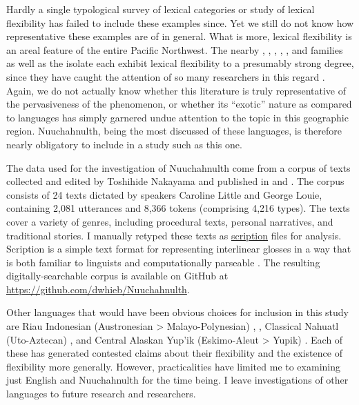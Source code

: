 Hardly a single typological survey of lexical categories or study of lexical flexibility has failed to include these examples since. Yet we still do not know how representative these examples are of  in general. What is more, lexical flexibility is an areal feature of the entire Pacific Northwest. The nearby , , , , , and  families as well as the isolate  each exhibit lexical flexibility to a presumably strong degree, since they have caught the attention of so many researchers in this regard . Again, we do not actually know whether this literature is truly representative of the pervasiveness of the phenomenon, or whether its \enquote{exotic} nature as compared to  languages has simply garnered undue attention to the topic in this geographic region. Nuuchahnulth, being the most discussed of these languages, is therefore nearly obligatory to include in a study such as this one.

The data used for the investigation of Nuuchahnulth come from a corpus of texts collected and edited by Toshihide Nakayama and published in \textcite{Little2003} and \textcite{Louie2003}. The corpus consists of 24 texts dictated by speakers Caroline Little and George Louie, containing 2,081 utterances and 8,366 tokens (comprising 4,216 types). The texts cover a variety of genres, including procedural texts, personal narratives, and traditional stories. I manually retyped these texts as \href{https://scription.digitallinguistics.io}{scription} files for analysis. Scription is a simple text format for representing interlinear glosses in a way that is both familiar to linguists and computationally parseable \parencite{Hieber2020b}. The resulting digitally-searchable corpus is available on GitHub at \url{https://github.com/dwhieb/Nuuchahnulth}.

Other languages that would have been obvious choices for inclusion in this study are Riau Indonesian (Austronesian > Malayo-Polynesian) \parencite{Gil1994},  \parencites{EvansOsada2005}{HengeveldRijkhoff2005}, Classical Nahuatl (Uto-Aztecan) \parencites{Launey1994}{Launey2004}, and Central Alaskan Yup'ik (Eskimo-Aleut > Yupik) \parencites{Thalbitzer1922}{Sadock1999}{Mithun2017}. Each of these has generated contested claims about their flexibility and the existence of flexibility more generally. However, practicalities have limited me to examining just English and Nuuchahnulth for the time being. I leave investigations of other languages to future research and researchers.

